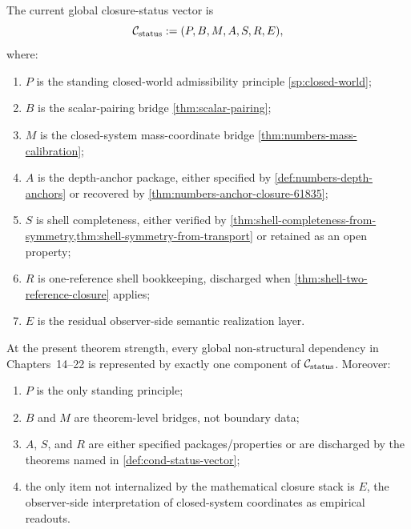 \begin{definition}
\label{def:cond-status-vector}
The current global closure-status vector is
\[
  \mathcal C_{\rm status}
  :=
  (P, B, M, A, S, R, E),
\]
where:
\begin{enumerate}[label=\textup{(\roman*)}]
\item \(P\) is the standing closed-world admissibility principle
      \cref{sp:closed-world};
\item \(B\) is the scalar-pairing bridge
      \cref{thm:scalar-pairing};
\item \(M\) is the closed-system mass-coordinate bridge
      \cref{thm:numbers-mass-calibration};
\item \(A\) is the depth-anchor package, either specified by
      \cref{def:numbers-depth-anchors} or recovered by
      \cref{thm:numbers-anchor-closure-61835};
\item \(S\) is shell completeness, either verified by
      \cref{thm:shell-completeness-from-symmetry,thm:shell-symmetry-from-transport}
      or retained as an open property;
\item \(R\) is one-reference shell bookkeeping, discharged when
      \cref{thm:shell-two-reference-closure} applies;
\item \(E\) is the residual observer-side semantic realization layer.
\end{enumerate}
\end{definition}

\begin{theorem}
\label{thm:cond-closure-normal-form}
At the present theorem strength, every global non-structural dependency in
Chapters~14--22 is represented by exactly one component of
\(\mathcal C_{\rm status}\).  Moreover:
\begin{enumerate}[label=\textup{(\roman*)}]
\item \(P\) is the only standing principle;
\item \(B\) and \(M\) are theorem-level bridges, not boundary data;
\item \(A\), \(S\), and \(R\) are either specified packages/properties or are
      discharged by the theorems named in \cref{def:cond-status-vector};
\item the only item not internalized by the mathematical closure stack is
      \(E\), the observer-side interpretation of closed-system coordinates as
      empirical readouts.
\end{enumerate}
\end{theorem}


